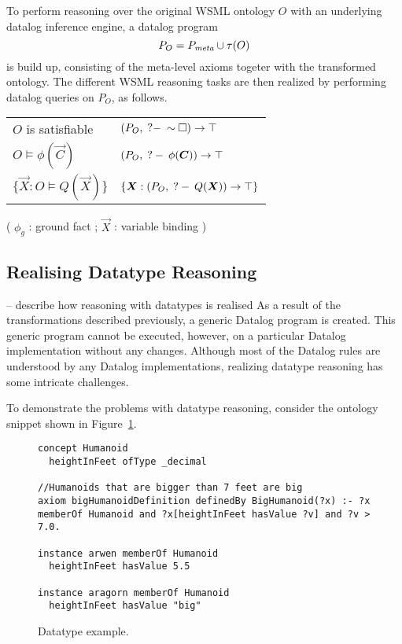 To perform reasoning over the original WSML ontology $O$ with an
underlying datalog inference engine, a datalog program
\begin{displaymath}
    P_O = \mlaxioms \cup \tau(O)
\end{displaymath}
is build up, consisting of the meta-level axioms togeter with the
transformed ontology. The different WSML reasoning tasks are then
realized by performing datalog queries on $P_O$, as follows.
\begin{small}
\begin{tabular}{|l|l|}
  \hline
  $O$ is satisfiable & $(P_O, \;?-\: \sim \square) \rightarrow \top$ \\
  $O \models \phi(\vec{C})$ & $(P_O, \qury \phi(\vec{C})) \rightarrow \top$ \\
  $\{\vec{X} : O \models Q(\vec{X})\}$ & $\{\vec{X} : (P_O, \qury Q(\vec{X})) \rightarrow \top\}$ \\
 \hline
\end{tabular}
\end{small}

( $\phi_g$ : ground fact ; $\vec{X}$ : variable binding )


\subsection{Realising Datatype Reasoning}
-- describe how reasoning with datatypes is realised As a result
of the transformations described previously, a generic Datalog
program is created. This generic program cannot be executed,
however, on a particular Datalog implementation without any
changes. Although most of the Datalog rules are understood by any
Datalog implementations, realizing datatype reasoning has some
intricate challenges.

To demonstrate the problems with datatype reasoning, consider the
ontology snippet shown in Figure~\ref{fig:datatype_example}.

\begin{figure}[hbt]
\centering
\begin{lstlisting}[style=wsml, frame=none]
concept Humanoid
  heightInFeet ofType _decimal

//Humanoids that are bigger than 7 feet are big
axiom bigHumanoidDefinition definedBy BigHumanoid(?x) :- ?x
memberOf Humanoid and ?x[heightInFeet hasValue ?v] and ?v > 7.0.

instance arwen memberOf Humanoid
  heightInFeet hasValue 5.5

instance aragorn memberOf Humanoid
  heightInFeet hasValue "big"
\end{lstlisting}
 \caption{Datatype example. \label{fig:datatype_example}}
\end{figure}

